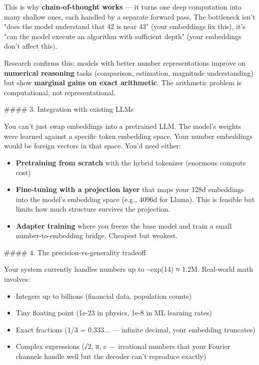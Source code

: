 \documentclass[11pt]{article}
\begin{document}
This is why \textbf{chain-of-thought works} — it turns one deep computation into many shallow ones, each handled by a separate forward pass. The bottleneck isn't "does the model understand that 42 is near 43" (your embeddings fix this), it's "can the model execute an algorithm with sufficient depth" (your embeddings don't affect this).


Research confirms this: models with better number representations improve on \textbf{numerical reasoning} tasks (comparison, estimation, magnitude understanding) but show \textbf{marginal gains on exact arithmetic}. The arithmetic problem is computational, not representational.


\#\#\#\# 3. Integration with existing LLMs


You can't just swap embeddings into a pretrained LLM. The model's weights were learned against a specific token embedding space. Your number embeddings would be foreign vectors in that space. You'd need either:


\begin{itemize}
\item \textbf{Pretraining from scratch} with the hybrid tokenizer (enormous compute cost)
\item \textbf{Fine-tuning with a projection layer} that maps your 128d embeddings into the model's embedding space (e.g., 4096d for Llama). This is feasible but limits how much structure survives the projection.
\item \textbf{Adapter training} where you freeze the base model and train a small number-to-embedding bridge. Cheapest but weakest.
\end{itemize}


\#\#\#\# 4. The precision-vs-generality tradeoff


Your system currently handles numbers up to \textasciitilde{}exp(14) ≈ 1.2M. Real-world math involves:

\begin{itemize}
\item Integers up to billions (financial data, population counts)
\item Tiny floating point (1e-23 in physics, 1e-8 in ML learning rates)
\item Exact fractions (1/3 = 0.333... — infinite decimal, your embedding truncates)
\item Complex expressions (√2, π, e — irrational numbers that your Fourier channels handle well but the decoder can't reproduce exactly)
\end{itemize}
\end{document}
